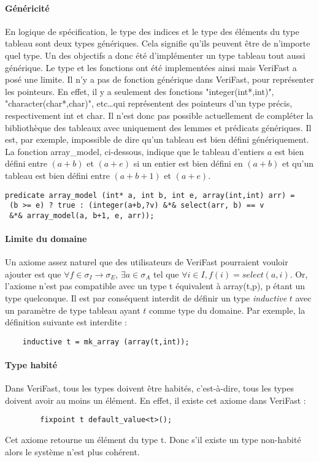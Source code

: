 \documentclass[11pt,openany]{article}
\newcommand{\verifast}{VeriFast}
\begin{document}
			\paragraph{G\'en\'ericit\'e}
			En logique de sp\'ecification, le type des indices et le type des \'el\'ements du type tableau sont deux types g\'en\'eriques. Cela signifie qu'ils peuvent \^etre de n'importe quel type. Un des objectifs a donc \'et\'e d'impl\'ementer un type tableau tout aussi g\'en\'erique. Le type et les fonctions ont \'et\'e implement\'ees ainsi mais \verifast{} a pos\'e une limite. Il n'y a pas de fonction g\'en\'erique dans \verifast, pour repr\'esenter les pointeurs. En effet, il y a seulement des fonctions "integer(int*,int)", "character(char*,char)", etc\ldots qui repr\'esentent des pointeurs d'un type pr\'ecis, respectivement int et char. Il n'est donc pas possible actuellement de compl\'eter la biblioth\`eque des tableaux avec uniquement des lemmes et pr\'edicats g\'en\'eriques. Il est, par exemple, impossible de dire qu'un tableau est bien d\'efini g\'en\'eriquement. La fonction array\_model, ci-dessous, indique que le tableau d'entiers $a$ est bien d\'efini entre $(a+b)$ et $(a+e)$ si un entier est bien d\'efini en $(a+b)$ et qu'un tableau est bien d\'efini entre $(a+b+1)$ et $(a+e)$.
\begin{lstlisting}
predicate array_model (int* a, int b, int e, array(int,int) arr) =
 (b >= e) ? true : (integer(a+b,?v) &*& select(arr, b) == v
 &*& array_model(a, b+1, e, arr));
\end{lstlisting}
			\paragraph{Limite du domaine}
			Un axiome assez naturel que des utilisateurs de \verifast{} pourraient vouloir ajouter est que $\forall f\in \sigma_I \rightarrow \sigma_E$, $\exists a\in \sigma_A$ tel que $\forall i\in I, f(i) = select(a,i)$.
		Or, l'axiome n'est pas compatible avec un type t \'equivalent \`a array(t,p), p \'etant un type quelconque. Il est par cons\'equent interdit de d\'efinir un type \textit{inductive} $t$ avec un param\`etre de type tableau ayant $t$ comme type du domaine. Par exemple, la d\'efinition suivante est interdite :
			\begin{lstlisting}			
    inductive t = mk_array (array(t,int));
			\end{lstlisting}
			\paragraph{Type habit\'e}
				Dans \verifast{}, tous les types doivent \^etre habit\'es, c'est-\`a-dire, tous les types doivent avoir au moins un \'el\'ement. En effet, il existe cet axiome dans \verifast{} :
		\begin{lstlisting}
		fixpoint t default_value<t>();
		\end{lstlisting}
		Cet axiome retourne un \'el\'ement du type t. Donc s'il existe un type non-habit\'e alors le syst\`eme n'est plus coh\'erent.
		
\end{document}
